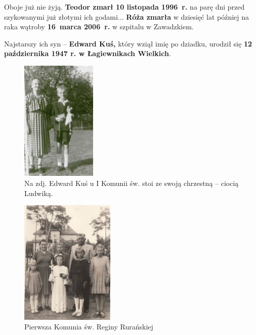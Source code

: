 Oboje już nie żyją. \textbf{Teodor zmarł 10 listopada 1996~r.} na parę dni przed szykowanymi już złotymi ich godami... \textbf{Róża zmarła} w dziesięć lat później na raka wątroby \textbf{16~marca 2006~r.} w szpitalu w Zawadzkiem.

Najstarszy ich syn -- \textbf{Edward Kuś,} który wziął imię po dziadku, urodził się \textbf{12 października 1947 r. w Łagiewnikach Wielkich}.

\begin{figure}[!h]
\begin{center}
\includegraphics[width=0.32\textwidth]{photo/edward_kus_komunia.jpg}
\caption[Edward Kuś u I Komunii św. ze swoją chrzestną -- ciocią Ludwiką]{Na zdj. Edward Kuś u I Komunii św. stoi ze swoją chrzestną -- ciocią Ludwiką.}
\label{rys:edward_kus_komunia}
\end{center}
\end{figure}

\begin{figure}[!h]
\begin{center}
\includegraphics[width=0.4\textwidth]{photo/regina_ruranska_komunia.jpg}
\caption{Pierwsza Komunia św. Reginy Rurańskiej}
\label{rys:regina_ruranska_komunia}
\end{center}
\end{figure}

